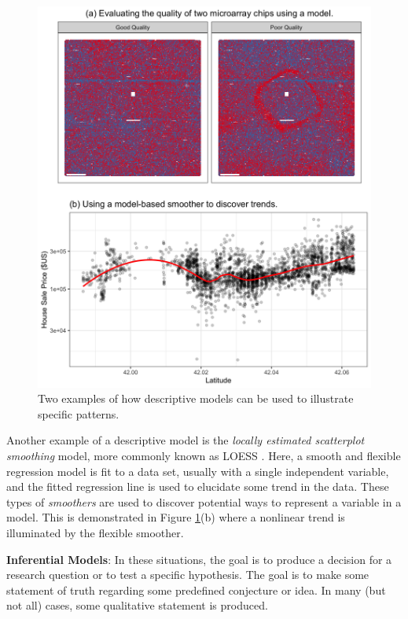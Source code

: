 \documentclass[11pt]{book}
\begin{document}
\begin{figure}

{\centering \includegraphics[width=0.8\linewidth]{figures/introduction-descr-examples-1} 

}

\caption{Two examples of how descriptive models can be used to illustrate specific patterns.}\label{fig:descr-examples}
\end{figure}

Another example of a descriptive model is the \emph{locally estimated scatterplot smoothing} model, more commonly known as LOESS \citep{cleveland1979}. Here, a smooth and flexible regression model is fit to a data set, usually with a single independent variable, and the fitted regression line is used to elucidate some trend in the data. These types of \emph{smoothers} are used to discover potential ways to represent a variable in a model. This is demonstrated in Figure \ref{fig:descr-examples}(b) where a nonlinear trend is illuminated by the flexible smoother.

\textbf{Inferential Models}: In these situations, the goal is to produce a decision for a research question or to test a specific hypothesis. The goal is to make some statement of truth regarding some predefined conjecture or idea. In many (but not all) cases, some qualitative statement is produced.
\end{document}
